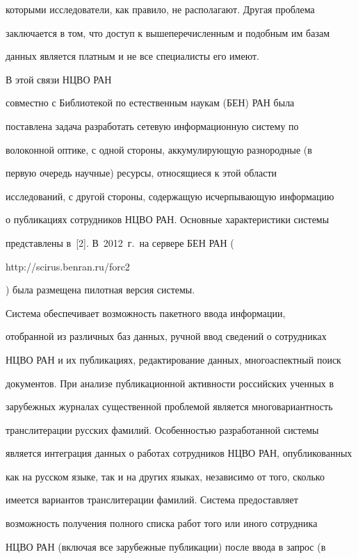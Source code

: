 которыми исследователи, как правило, не располагают. Другая проблема 


заключается в том, что доступ к вышеперечисленным и подобным им базам 


данных является платным и не все специалисты его имеют.


    


    В этой связи НЦВО РАН 


совместно с Библиотекой по естественным наукам (БЕН) РАН была 


поставлена задача разработать сетевую информационную систему по 


волоконной оптике, с одной стороны, аккумулирующую разнородные (в 


первую очередь научные) ресурсы, относящиеся к этой области 


исследований, с другой стороны, содержащую исчерпывающую информацию 


о публикациях сотрудников НЦВО РАН. Основные характеристики системы 


представлены в~[2]. В~2012~г.\ на сервере БЕН РАН ({\sf 


http://scirus.benran.ru/forc2}) была размещена пилотная версия системы. 


    


    Система обеспечивает возможность пакетного ввода информации, 


отобранной из различных баз данных, ручной ввод сведений о сотрудниках 


НЦВО РАН и их публикациях, редактирование данных, многоаспектный поиск 


документов. При анализе публикационной активности российских ученных в 


зарубежных журналах существенной проблемой является многовариантность 


транслитерации русских фамилий. Особенностью разработанной системы 


является интеграция данных о работах сотрудников НЦВО РАН, опубликованных 


как на русском языке, так и на других языках, независимо от того, сколько 


имеется вариантов транслитерации фамилий. Система предоставляет 


возможность получения полного списка работ того или иного сотрудника 


НЦВО РАН (включая все зарубежные публикации) после ввода в запрос (в 


